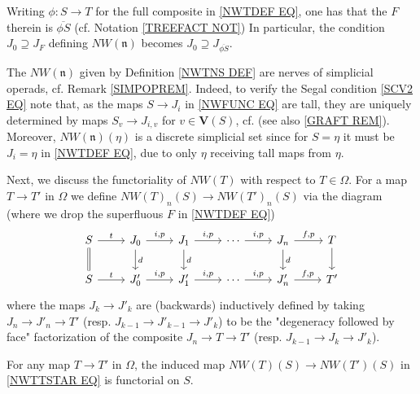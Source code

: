 \documentclass{hha}
\theoremstyle{definition} %
\begin{document}
\begin{remark}\label{J0JFREPACK REM}
	Writing $\phi \colon S \to T$ for the full composite in \eqref{NWTDEF EQ},
	one has that the $F$ therein is $\overline{\phi S}$
	(cf. Notation \ref{TREEFACT NOT})
	In particular, the condition $J_0 \supseteq J_F$
	defining $NW(\mathfrak{n})$
	becomes $J_0 \supseteq J_{\overline{\phi S}}$.
\end{remark}


\begin{remark}\label{NWTNS_REM}
	The $NW(\mathfrak{n})$ given by Definition \ref{NWTNS DEF}
	are nerves of simplicial operads,
	cf. Remark \ref{SIMPOPREM}.
	Indeed, to verify the Segal condition \eqref{SCV2 EQ} note that,
	as the maps $S \to J_i$ in \eqref{NWFUNC EQ}
	are tall, they are uniquely determined by maps
	$S_v \to J_{i,v}$ for $v \in \boldsymbol{V}(S)$,
	cf. \cite[Cor 3.75]{BP_geo} 
	(see also \ref{GRAFT REM}).
	Moreover,  $NW(\mathfrak{n})(\eta)$ is a discrete simplicial set
	since for $S=\eta$ it must be $J_i = \eta$ in \eqref{NWTDEF EQ},
	due to only $\eta$ receiving tall maps from $\eta$.
\end{remark}


Next, we discuss the functoriality of
$NW(T)$ with respect to $T \in \Omega$.
%
For a map $T \to T'$ in $\Omega$ we define
$NW(T)_n(S)
	\to 
NW(T')_n(S)$
via the diagram (where we drop the superfluous $F$ in \eqref{NWTDEF EQ})
\begin{equation}\label{NWTTSTAR EQ}
\begin{tikzcd}
	S \ar{r}{t} \ar[equal]{d}
&
	J_0 \ar{r}{i,p} \ar{d}{d}
&
	J_1 \ar{r}{i,p} \ar{d}{d}
&
	\cdots \ar{r}{i,p}
&
J_n \ar{r}{f,p} \ar{d}{d}
&
	T \ar{d}
\\
	S \ar{r}{t} 
&
	J'_0 \ar{r}{i,p}
&
	J'_1 \ar{r}{i,p}
&
	\cdots \ar{r}{i,p}
&
	J'_n \ar{r}{f,p}
&
	T'
\end{tikzcd}
\end{equation}
where the maps $J_k \to J'_k$
are (backwards) inductively defined
by taking 
$J_n \to J'_n \to T'$
(resp. 
$J_{k-1} \to J'_{k-1} \to J'_k$)
to be the "degeneracy followed by face"
factorization of the composite
$J_n \to T \to T'$
(resp.
$J_{k-1} \to J_{k} \to J'_k$).



\begin{proposition}\label{NWTNS_NAT_PROP}
	For any map $T \to T'$ in $\Omega$, the induced map
	$NW(T)(S)
	\to 
	NW(T')(S)$
	in 
	\eqref{NWTTSTAR EQ}
	is functorial on $S$.
\end{proposition}
\end{document}
